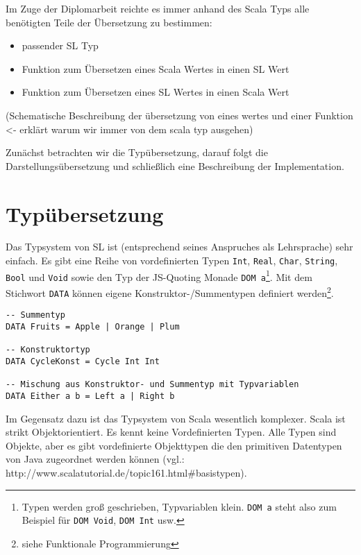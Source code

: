 \documentclass[12pt,a4paper]{report}
\begin{document}
Im Zuge der Diplomarbeit reichte es immer anhand des Scala Typs alle benötigten Teile der Übersetzung zu bestimmen:
\begin{itemize}
\item passender \ac{SL} Typ
\item Funktion zum Übersetzen eines Scala Wertes in einen \ac{SL} Wert
\item Funktion zum Übersetzen eines \ac{SL} Wertes in einen Scala Wert
\end{itemize}

(Schematische Beschreibung der übersetzung von eines wertes und einer Funktion <- erklärt warum wir immer von dem scala typ ausgehen)

Zunächst betrachten wir die Typübersetzung, darauf folgt die Darstellungsübersetzung und schließlich eine Beschreibung der Implementation.

\section{Typübersetzung}

Das Typsystem von \ac{SL} ist (entsprechend seines Anspruches als Lehrsprache) sehr einfach. Es gibt eine Reihe von vordefinierten Typen \lstinline!Int!, \lstinline!Real!, \lstinline!Char!, \lstinline!String!, \lstinline!Bool! und \lstinline!Void! sowie den Typ der \ac{JS}-Quoting Monade \lstinline!DOM a!\footnote{Typen werden groß geschrieben, Typvariablen klein. \lstinline!DOM a! steht also zum Beispiel für \lstinline!DOM Void!, \lstinline!DOM Int! usw.}. Mit dem Stichwort \lstinline!DATA! können eigene Konstruktor-/Summentypen definiert werden\footnote{siehe Funktionale Programmierung}.

\begin{lstlisting}[caption=Beispiele für selbstdefinierte Datentypen in \ac{SL}, label=lst:bsp2]
-- Summentyp
DATA Fruits = Apple | Orange | Plum

-- Konstruktortyp
DATA CycleKonst = Cycle Int Int

-- Mischung aus Konstruktor- und Summentyp mit Typvariablen
DATA Either a b = Left a | Right b
\end{lstlisting}

Im Gegensatz dazu ist das Typsystem von Scala wesentlich komplexer. Scala ist strikt Objektorientiert. Es kennt keine Vordefinierten Typen. Alle Typen sind Objekte, aber es gibt vordefinierte Objekttypen die den primitiven Datentypen von Java zugeordnet werden können (vgl.: http://www.scalatutorial.de/topic161.html\#basistypen).
\end{document}
